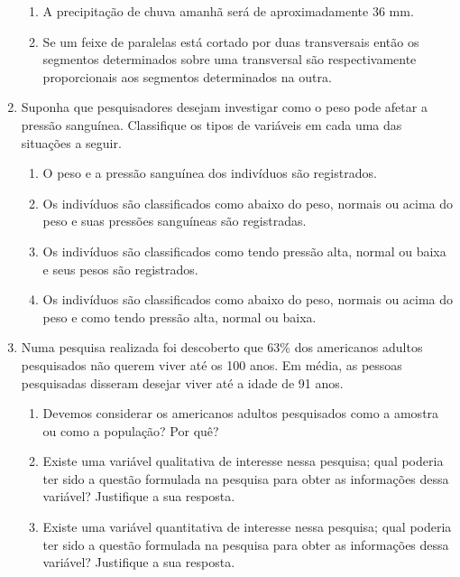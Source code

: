 \begin{enumerate}
\begin{enumerate}
\item {} 
A precipitação de chuva amanhã será de aproximadamente 36 mm.

\item {} 
Se um feixe de paralelas está cortado por duas transversais então os segmentos determinados sobre uma transversal são respectivamente proporcionais aos segmentos determinados na outra.

\end{enumerate}

\item Suponha que pesquisadores desejam investigar como o peso pode afetar a pressão sanguínea. Classifique os tipos de variáveis em cada uma das situações a seguir.
\begin{enumerate}
\item {} 
O peso e a pressão sanguínea dos indivíduos são registrados.

\item {} 
Os indivíduos são classificados como abaixo do peso, normais ou acima do peso e suas pressões sanguíneas são registradas.

\item {} 
Os indivíduos são classificados como tendo pressão alta, normal ou baixa e seus pesos são registrados.

\item {} 
Os indivíduos são classificados como abaixo do peso, normais ou acima do peso e como tendo pressão alta, normal ou baixa.

\end{enumerate}

\item Numa pesquisa realizada foi descoberto que 63\% dos americanos adultos pesquisados não querem viver até os 100 anos. Em média, as pessoas pesquisadas disseram desejar viver até a idade de 91 anos.
\begin{enumerate}
\item {} 
Devemos considerar os americanos adultos pesquisados como a amostra ou como a população? Por quê?

\item {} 
Existe uma variável qualitativa de interesse nessa pesquisa; qual poderia ter sido a questão formulada na pesquisa para obter as informações dessa variável? Justifique a sua resposta.

\item {} 
Existe uma variável quantitativa de interesse nessa pesquisa; qual poderia ter sido a questão formulada na pesquisa para obter as informações dessa variável? Justifique a sua resposta.


\end{enumerate}
\end{enumerate}
